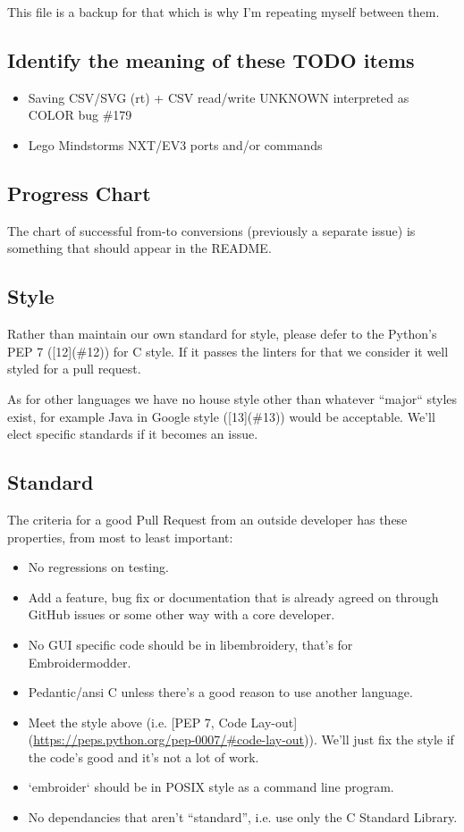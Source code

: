 This file is a backup for that which is why I'm repeating myself between
them.

\subsection{Identify the meaning of these TODO items}

\begin{itemize}
\item Saving CSV/SVG (rt) + CSV read/write UNKNOWN interpreted as COLOR bug \#179
\item Lego Mindstorms NXT/EV3 ports and/or commands
\end{itemize}

\subsection{Progress Chart}

The chart of successful from-to conversions (previously a separate issue)
is something that should appear in the README.

\subsection{Style}

Rather than maintain our own standard for style, please defer to
the Python's PEP 7 ([12](\#12)) for C style.
If it passes the linters for that we consider it well styled
for a pull request.

As for other languages we have no house style other than whatever
``major`` styles exist, for example Java in
Google style ([13](\#13))
would be acceptable. We'll elect specific standards if it becomes
an issue.

\subsection{Standard}

The criteria for a good Pull Request from an outside developer has these properties, from most to least important:

\begin{itemize}
\item No regressions on testing.
\item Add a feature, bug fix or documentation that is already agreed on through GitHub issues or some other way with a core developer.
\item No GUI specific code should be in libembroidery, that's for Embroidermodder.
\item Pedantic/ansi C unless there's a good reason to use another language.
\item Meet the style above (i.e. [PEP 7, Code Lay-out](\url{https://peps.python.org/pep-0007/#code-lay-out})). We'll just fix the style if the code's good and it's not a lot of work.
\item `embroider` should be in POSIX style as a command line program.
\item No dependancies that aren't ``standard'', i.e. use only the C Standard Library.
\end{itemize}

